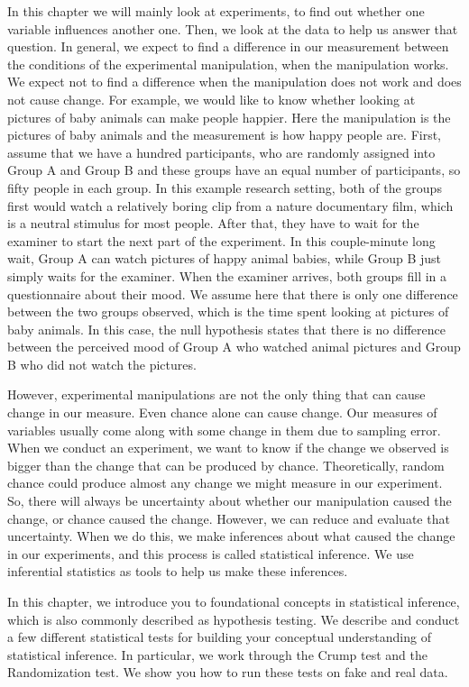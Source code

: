 \documentclass[
]{book}
\begin{document}
In this chapter we will mainly look at experiments, to find out whether one variable influences another one. Then, we look at the data to help us answer that question. In general, we expect to find a difference in our measurement between the conditions of the experimental manipulation, when the manipulation works. We expect not to find a difference when the manipulation does not work and does not cause change. For example, we would like to know whether looking at pictures of baby animals can make people happier. Here the manipulation is the pictures of baby animals and the measurement is how happy people are. First, assume that we have a hundred participants, who are randomly assigned into Group A and Group B and these groups have an equal number of participants, so fifty people in each group. In this example research setting, both of the groups first would watch a relatively boring clip from a nature documentary film, which is a neutral stimulus for most people. After that, they have to wait for the examiner to start the next part of the experiment. In this couple-minute long wait, Group A can watch pictures of happy animal babies, while Group B just simply waits for the examiner. When the examiner arrives, both groups fill in a questionnaire about their mood. We assume here that there is only one difference between the two groups observed, which is the time spent looking at pictures of baby animals. In this case, the null hypothesis states that there is no difference between the perceived mood of Group A who watched animal pictures and Group B who did not watch the pictures.

However, experimental manipulations are not the only thing that can cause change in our measure. Even chance alone can cause change. Our measures of variables usually come along with some change in them due to sampling error. When we conduct an experiment, we want to know if the change we observed is bigger than the change that can be produced by chance. Theoretically, random chance could produce almost any change we might measure in our experiment. So, there will always be uncertainty about whether our manipulation caused the change, or chance caused the change. However, we can reduce and evaluate that uncertainty. When we do this, we make inferences about what caused the change in our experiments, and this process is called statistical inference. We use inferential statistics as tools to help us make these inferences.

In this chapter, we introduce you to foundational concepts in statistical inference, which is also commonly described as hypothesis testing. We describe and conduct a few different statistical tests for building your conceptual understanding of statistical inference. In particular, we work through the Crump test and the Randomization test. We show you how to run these tests on fake and real data.
\end{document}
